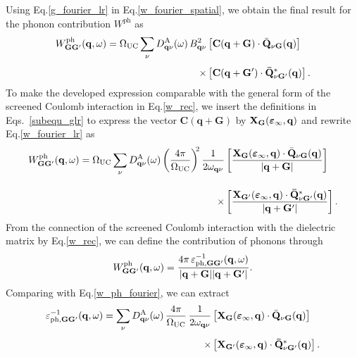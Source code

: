 %
Using Eq.\;\eqref{g_fourier_lr} in Eq.\;\eqref{w_fourier_spatial}, we obtain the final result for the phonon contribution $W^\text{ph}$ as
%
\begin{equation}\label{w_fourier_lr}
\begin{aligned}
     W^\text{ph}_\mathbf{GG'}(\mathbf{q},\omega)  = \Omega_\text{UC}\sum_\nu D^\text{A}_{\mathbf{q}\nu}(\omega)\,B^2_{\mathbf{q}\nu} & \left[\mathbf{C(q+G)}\cdot\bar{\mathbf{Q}}_{\nu\mathbf{G}}(\mathbf{q})\right]\\[4pt]
     \times & \left[\mathbf{C(q+G')}\cdot\mathbf{\bar{Q}}^*_{\nu\mathbf{G'}}(\mathbf{q})\right].
\end{aligned}
\end{equation}
%
To make the developed expression comparable with the general form of the screened Coulomb interaction in Eq.\;\eqref{w_rec}, we insert the  definitions in Eqs.~\eqref{subequ_glr} to express the vector $\mathbf{C(q+G)}$ by  $\mathbf{X}_{\mathbf{G}}(\boldsymbol{\varepsilon}_\infty,\mathbf{q})$ and rewrite Eq.\;\eqref{w_fourier_lr} as  
%
\begin{equation}\label{w_ph_fourier}
\begin{aligned}
     W^\text{ph}_\mathbf{GG'}(\mathbf{q},\omega)  = \Omega_\text{UC}\sum_\nu D^\text{A}_{\mathbf{q}\nu}(\omega)  \left(\frac{4\pi}{\Omega_\text{UC}}\right)^{\!\!2} \frac{1}{2\omega_{\mathbf{q}\nu}} & \left[\frac{\mathbf{X}_{\mathbf{G}}(\boldsymbol{\varepsilon}_\infty,\mathbf{q})\cdot\bar{\mathbf{Q}}_{\nu\mathbf{G}}(\mathbf{q})}{|\mathbf{q+G}|}\right]\\[10pt]
     \times & \left[\frac{\mathbf{X}_\mathbf{G'}(\boldsymbol{\varepsilon}_\infty,\mathbf{q})\cdot\mathbf{\bar{Q}}^*_{\nu\mathbf{G'}}(\mathbf{q})}{|\mathbf{q+G'}|}\right].
\end{aligned}
\end{equation}
%
From the connection of the screened Coulomb interaction with the dielectric matrix by Eq.\;\eqref{w_rec}, we can define the contribution of phonons through 
%
\begin{equation}
     W^\text{ph}_\mathbf{GG'}(\mathbf{q},\omega) = \frac{4\pi\, \varepsilon^{-1}_{\text{ph},\mathbf{GG'}}(\mathbf{q},\omega)}{|\mathbf{q+G}||\mathbf{q+G'}|}.
\end{equation}
%
Comparing with Eq.\;\eqref{w_ph_fourier}, we can extract 
%
\begin{equation}
\begin{aligned}
   \varepsilon^{-1}_{\text{ph},\mathbf{GG'}}(\mathbf{q},\omega) = \sum_\nu D^\text{A}_{\mathbf{q}\nu}(\omega)\,\frac{4\pi}{\Omega_\text{UC}}\, \frac{1}{2\omega_{\mathbf{q}\nu}} & \left[ \mathbf{X}_{\mathbf{G}}(\boldsymbol{\varepsilon}_\infty,\mathbf{q})\cdot\bar{\mathbf{Q}}_{\nu\mathbf{G}}(\mathbf{q})\right] \\[4pt]
       \times & \left[\mathbf{X}_\mathbf{G'}(\boldsymbol{\varepsilon}_\infty,\mathbf{q})\cdot\mathbf{\bar{Q}}^*_{\nu\mathbf{G'}}(\mathbf{q})\right].
\end{aligned}
\end{equation}




